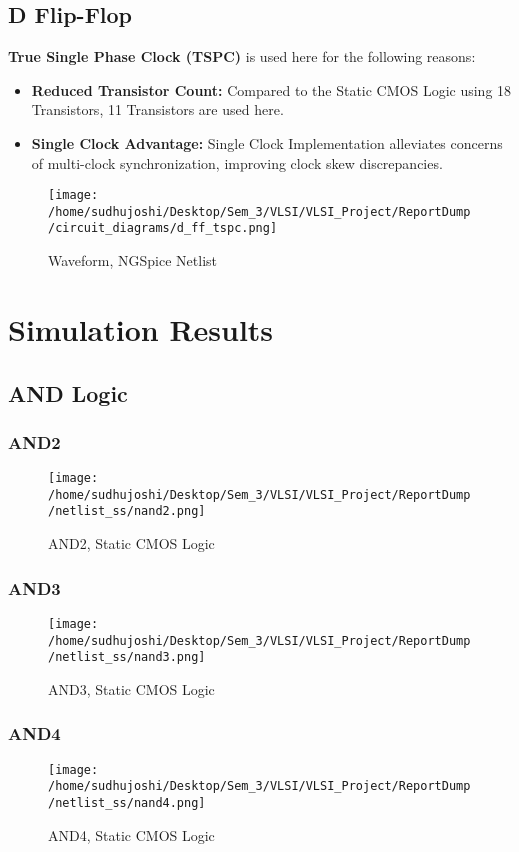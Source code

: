 \documentclass[conference]{IEEEtran}
\begin{document}
\subsection{D Flip-Flop}
\textbf{True Single Phase Clock (TSPC)} is used here for the following reasons:
\begin{itemize}
    \item \textbf{Reduced Transistor Count:} Compared to the Static CMOS Logic using 18 Transistors, 11 Transistors are used here.
    \item \textbf{Single Clock Advantage:} Single Clock Implementation alleviates concerns of multi-clock synchronization, improving clock skew discrepancies.
\end{itemize}
\begin{figure}[H] 
    \centering
    \texttt{[image: /home/sudhujoshi/Desktop/Sem\_3/VLSI/VLSI\_Project/ReportDump/circuit\_diagrams/d\_ff\_tspc.png]}
    \caption{Waveform, NGSpice Netlist} 
\end{figure}


\section{Simulation Results}
\subsection{AND Logic}
\subsubsection{AND2}
\begin{figure}[H] 
    \centering
    \texttt{[image: /home/sudhujoshi/Desktop/Sem\_3/VLSI/VLSI\_Project/ReportDump/netlist\_ss/nand2.png]}
    \caption{AND2, Static CMOS Logic} 
\end{figure}
\subsubsection{AND3}
\begin{figure}[H] 
    \centering
    \texttt{[image: /home/sudhujoshi/Desktop/Sem\_3/VLSI/VLSI\_Project/ReportDump/netlist\_ss/nand3.png]}
    \caption{AND3, Static CMOS Logic} 
\end{figure}
\subsubsection{AND4}
\begin{figure}[H] 
    \centering
    \texttt{[image: /home/sudhujoshi/Desktop/Sem\_3/VLSI/VLSI\_Project/ReportDump/netlist\_ss/nand4.png]}
    \caption{AND4, Static CMOS Logic} 
\end{figure}
\end{document}
